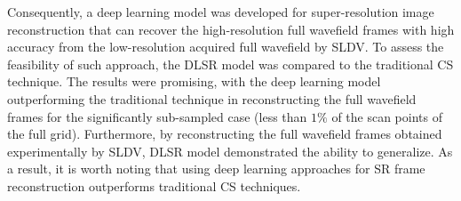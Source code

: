 \begin{itemize}
	Consequently, a deep learning model was developed for super-resolution image reconstruction that can recover the high-resolution full wavefield frames with high accuracy from the low-resolution acquired full wavefield by SLDV.
	To assess the feasibility of such approach, the DLSR model was compared to the traditional CS technique.
	The results were promising, with the deep learning model outperforming the traditional technique in reconstructing the full wavefield frames for the significantly sub-sampled case (less than $1\%$ of the scan points of the full grid).
	Furthermore, by reconstructing the full wavefield frames obtained experimentally by SLDV, DLSR model demonstrated the ability to generalize.
	As a result, it is worth noting that using deep learning approaches for SR frame reconstruction outperforms traditional CS techniques.
\end{itemize}
\clearpage
